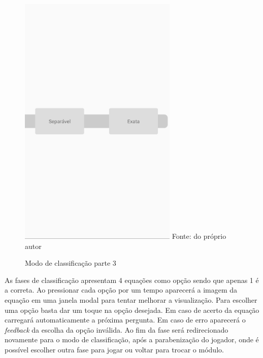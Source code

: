 \begin{figure}[H]
\centering
\caption{Modo de classificação parte 3}
\includegraphics[scale=0.72]{figuras/modo_classificacao_3.png}
\small{Fonte: do próprio autor}
\end{figure}

As fases de classificação apresentam 4 equações como opção sendo que apenas 1 é a correta.
Ao pressionar cada opção por um tempo aparecerá a imagem da equação em uma janela modal para tentar melhorar a visualização.
Para escolher uma opção basta dar um toque na opção desejada.
Em caso de acerto da equação carregará automaticamente a próxima pergunta.
Em caso de erro aparecerá o \textit{feedback} da escolha da opção inválida.
Ao fim da fase será redirecionado novamente para o modo de classificação, após a parabenização do jogador, onde é possível escolher outra fase para jogar ou voltar para trocar o módulo.

